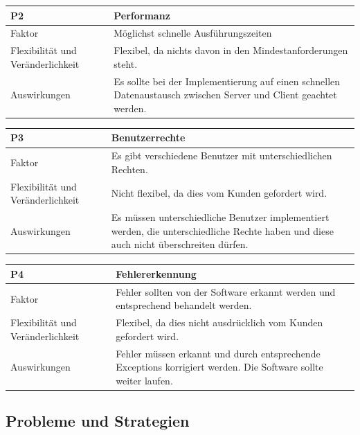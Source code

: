 \documentclass[fontsize=12pt,paper=a4,twoside]{scrartcl}
\begin{document}
\begin{table}[H]
\begin{tabular}{|p{3cm}|p{12cm}|}\hline
\textbf{P2} &  \textbf{Performanz}\\ \hline \hline
Faktor & Möglichst schnelle Ausführungszeiten\\ \hline
Flexibilität und Veränderlichkeit & Flexibel, da nichts davon in den Mindestanforderungen steht.\\ \hline
Auswirkungen & Es sollte bei der Implementierung auf einen schnellen Datenaustausch zwischen Server und Client geachtet werden. \\ \hline
\end{tabular}
\end{table}

\begin{table}[H]
\begin{tabular}{|p{3cm}|p{12cm}|}\hline
\textbf{P3} &  \textbf{Benutzerrechte} \\ \hline \hline
Faktor & Es gibt verschiedene Benutzer mit unterschiedlichen Rechten.\\ \hline
Flexibilität und Veränderlichkeit & Nicht flexibel, da dies vom Kunden gefordert wird.\\ \hline
Auswirkungen & Es müssen unterschiedliche Benutzer implementiert werden, die unterschiedliche Rechte haben und diese auch nicht überschreiten dürfen. \\ \hline
\end{tabular}
\end{table}

\begin{table}[H]
\begin{tabular}{|p{3cm}|p{12cm}|}\hline
\textbf{P4} &  \textbf{Fehlererkennung} \\ \hline \hline
Faktor & Fehler sollten von der Software erkannt werden und entsprechend behandelt werden.\\ \hline
Flexibilität und Veränderlichkeit & Flexibel, da dies nicht ausdrücklich vom Kunden gefordert wird.\\ \hline
Auswirkungen & Fehler müssen erkannt und durch entsprechende Exceptions korrigiert werden. Die Software sollte weiter laufen.  \\ \hline
\end{tabular}
\end{table}


\subsection{Probleme und Strategien}
\label{sec:strategien}
\end{document}
